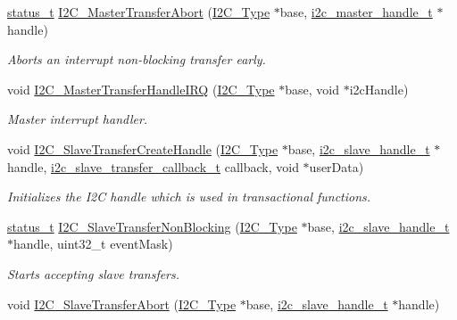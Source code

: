 \begin{DoxyCompactItemize}
\mbox{\hyperlink{group__ksdk__common_gaaabdaf7ee58ca7269bd4bf24efcde092}{status\+\_\+t}} \mbox{\hyperlink{group__i2c__driver_gabb386e53b2bc64e29b2915bdfac36800}{I2\+C\+\_\+\+Master\+Transfer\+Abort}} (\mbox{\hyperlink{struct_i2_c___type}{I2\+C\+\_\+\+Type}} $\ast$base, \mbox{\hyperlink{group__i2c__driver_ga2fd51f58b8cfd309be985bce4b817fdc}{i2c\+\_\+master\+\_\+handle\+\_\+t}} $\ast$handle)
\begin{DoxyCompactList}\small\item\em Aborts an interrupt non-\/blocking transfer early. \end{DoxyCompactList}\item 
void \mbox{\hyperlink{group__i2c__driver_gad091cd1857d2bd8ce64583739b3a35d5}{I2\+C\+\_\+\+Master\+Transfer\+Handle\+I\+RQ}} (\mbox{\hyperlink{struct_i2_c___type}{I2\+C\+\_\+\+Type}} $\ast$base, void $\ast$i2c\+Handle)
\begin{DoxyCompactList}\small\item\em Master interrupt handler. \end{DoxyCompactList}\item 
void \mbox{\hyperlink{group__i2c__driver_gac9b90f575d92ff8ad3cc350a5c8ad1b9}{I2\+C\+\_\+\+Slave\+Transfer\+Create\+Handle}} (\mbox{\hyperlink{struct_i2_c___type}{I2\+C\+\_\+\+Type}} $\ast$base, \mbox{\hyperlink{group__i2c__driver_ga394e5278816efe62815de9d25be84752}{i2c\+\_\+slave\+\_\+handle\+\_\+t}} $\ast$handle, \mbox{\hyperlink{group__i2c__driver_ga2583e3d8ebf8d3de410d8b6263238c35}{i2c\+\_\+slave\+\_\+transfer\+\_\+callback\+\_\+t}} callback, void $\ast$user\+Data)
\begin{DoxyCompactList}\small\item\em Initializes the I2C handle which is used in transactional functions. \end{DoxyCompactList}\item 
\mbox{\hyperlink{group__ksdk__common_gaaabdaf7ee58ca7269bd4bf24efcde092}{status\+\_\+t}} \mbox{\hyperlink{group__i2c__driver_gaa387d81ea08a9d4b39cfeb3dfec505f7}{I2\+C\+\_\+\+Slave\+Transfer\+Non\+Blocking}} (\mbox{\hyperlink{struct_i2_c___type}{I2\+C\+\_\+\+Type}} $\ast$base, \mbox{\hyperlink{group__i2c__driver_ga394e5278816efe62815de9d25be84752}{i2c\+\_\+slave\+\_\+handle\+\_\+t}} $\ast$handle, uint32\+\_\+t event\+Mask)
\begin{DoxyCompactList}\small\item\em Starts accepting slave transfers. \end{DoxyCompactList}\item 
void \mbox{\hyperlink{group__i2c__driver_ga5ae9f5e6e854d14d33ba3029128bd6f0}{I2\+C\+\_\+\+Slave\+Transfer\+Abort}} (\mbox{\hyperlink{struct_i2_c___type}{I2\+C\+\_\+\+Type}} $\ast$base, \mbox{\hyperlink{group__i2c__driver_ga394e5278816efe62815de9d25be84752}{i2c\+\_\+slave\+\_\+handle\+\_\+t}} $\ast$handle)

\end{DoxyCompactItemize}
